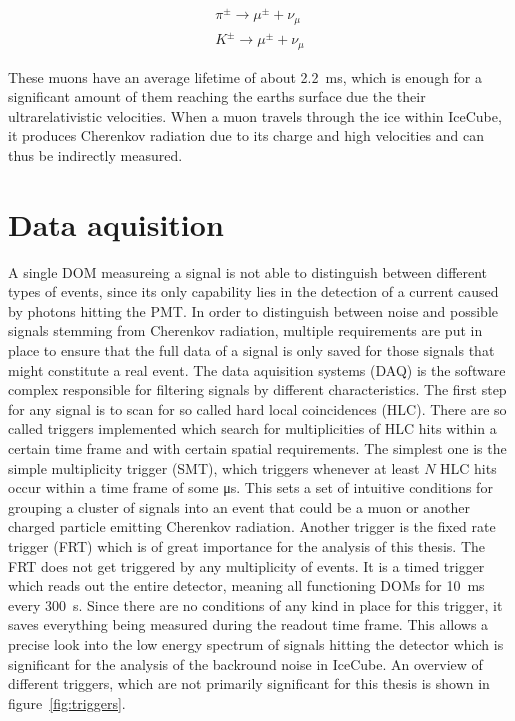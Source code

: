 \begin{align}
    \pi^\pm \to \mu^\pm + \nu_\mu \\
    K^\pm \to \mu^\pm + \nu_\mu
\end{align}

These muons have an average lifetime of about \SI{2.2}{ms}, which is enough for a significant amount of them reaching the earths surface due the their 
ultrarelativistic velocities. When a muon travels through the ice within IceCube, it produces Cherenkov radiation due to its charge and high velocities and 
can thus be indirectly measured.

\section{Data aquisition}\label{sec:daq}

A single DOM measureing a signal is not able to distinguish between different types of events, since its only capability lies in the detection of a current
caused by photons hitting the PMT\@. In order to distinguish between noise and possible signals stemming from Cherenkov radiation, multiple requirements are
put in place to ensure that the full data of a signal is only saved for those signals that might constitute a real event. The data aquisition systems (DAQ)
is the software complex responsible for filtering signals by different characteristics. The first step for any signal is to scan for so called hard local 
coincidences (HLC). 
There are so called triggers implemented which search for multiplicities of HLC hits within a certain time frame and with certain spatial requirements.
The simplest one is the simple multiplicity trigger (SMT), which triggers whenever at least $N$ HLC hits occur within a time frame of some 
\si{\micro\second}. This sets a set of intuitive conditions for grouping a cluster of signals into an event that could be a muon or another 
charged particle emitting Cherenkov radiation. 
Another trigger is the fixed rate trigger (FRT) which is of great importance for the analysis of this thesis. The FRT does not get triggered 
by any multiplicity of events. It is a timed trigger which reads out the entire detector, meaning all functioning DOMs for \SI{10}{ms}
every \SI{300}{s}. Since there are no conditions of any kind in place for this trigger, it saves everything being measured during the 
readout time frame. This allows a precise look into the low energy spectrum of signals hitting the detector which is significant for the 
analysis of the backround noise in IceCube. An overview of different triggers, which are not primarily significant for this thesis is shown 
in figure~\ref{fig:triggers}.

